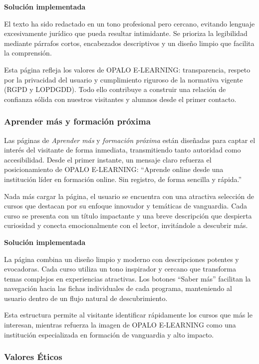 \documentclass[11.5pt]{article}
\begin{document}
	\noindent\textbf{{\large Solución implementada}}
	
	El texto ha sido redactado en un tono profesional pero cercano, evitando lenguaje excesivamente jurídico que pueda resultar intimidante. Se prioriza la legibilidad mediante párrafos cortos, encabezados descriptivos y un diseño limpio que facilita la comprensión.
	
	Esta página refleja los valores de OPALO E-LEARNING: transparencia, respeto por la privacidad del usuario y cumplimiento riguroso de la normativa vigente (RGPD y LOPDGDD). Todo ello contribuye a construir una relación de confianza sólida con nuestros visitantes y alumnos desde el primer contacto.
	
	\subsubsection{Aprender más y formación próxima}
	
	Las páginas de \textit{Aprender más} y \textit{formación próxima} están diseñadas para captar el interés del visitante de forma inmediata, transmitiendo tanto autoridad como accesibilidad. Desde el primer instante, un mensaje claro refuerza el posicionamiento de OPALO E-LEARNING: “Aprende online desde una institución líder en formación online. Sin registro, de forma sencilla y rápida.”
	
	Nada más cargar la página, el usuario se encuentra con una atractiva selección de cursos que destacan por su enfoque innovador y temáticas de vanguardia. Cada curso se presenta con un título impactante y una breve descripción que despierta curiosidad y conecta emocionalmente con el lector, invitándole a descubrir más.
	
	\noindent\textbf{{\large Solución implementada}}
	
	La página combina un diseño limpio y moderno con descripciones potentes y evocadoras. Cada curso utiliza un tono inspirador y cercano que transforma temas complejos en experiencias atractivas. Los botones “Saber más” facilitan la navegación hacia las fichas individuales de cada programa, manteniendo al usuario dentro de un flujo natural de descubrimiento.
	
	Esta estructura permite al visitante identificar rápidamente los cursos que más le interesan, mientras refuerza la imagen de OPALO E-LEARNING como una institución especializada en formación de vanguardia y alto impacto.
	
	\subsubsection{Valores Éticos}
	
\end{document}
